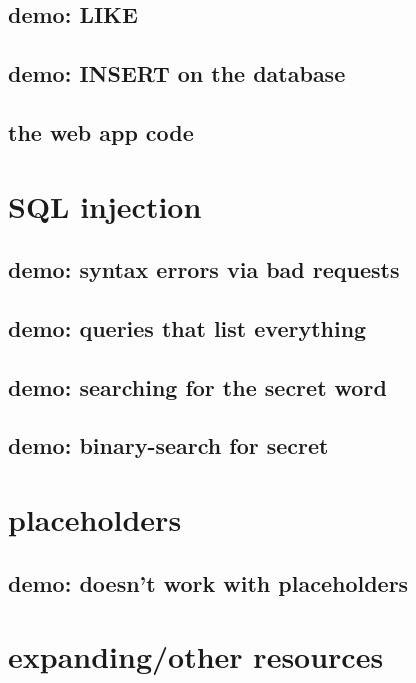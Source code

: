 \subsection{demo: LIKE}

\subsection{demo: INSERT on the database}

\subsection{the web app code}

\section{SQL injection}

\subsection{demo: syntax errors via bad requests}

\subsection{demo: queries that list everything}

\subsection{demo: searching for the secret word}

\subsection{demo: binary-search for secret}

\section{placeholders}

\subsection{demo: doesn't work with placeholders}

\section{expanding/other resources}
